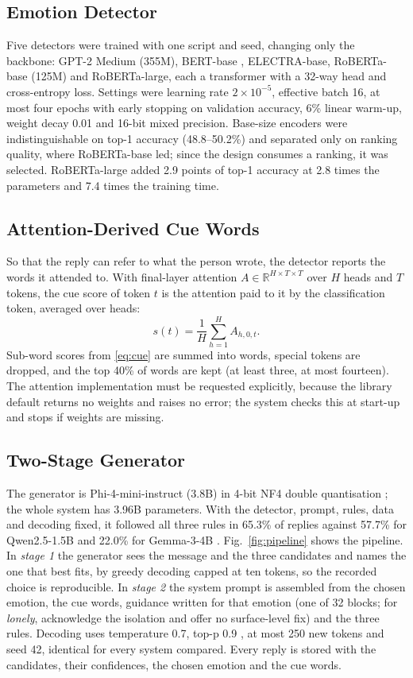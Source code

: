 \documentclass[conference]{IEEEtran}
\begin{document}
\subsection{Emotion Detector}
Five detectors were trained with one script and seed, changing only the backbone: GPT-2 Medium (355M), BERT-base \cite{b38}, ELECTRA-base, RoBERTa-base \cite{b39} (125M) and RoBERTa-large, each a transformer \cite{b40} with a 32-way head and cross-entropy loss. Settings were learning rate $2\times10^{-5}$, effective batch 16, at most four epochs with early stopping on validation accuracy, 6\% linear warm-up, weight decay 0.01 and 16-bit mixed precision. Base-size encoders were indistinguishable on top-1 accuracy (48.8--50.2\%) and separated only on ranking quality, where RoBERTa-base led; since the design consumes a ranking, it was selected. RoBERTa-large added 2.9 points of top-1 accuracy at 2.8 times the parameters and 7.4 times the training time.

\subsection{Attention-Derived Cue Words}
So that the reply can refer to what the person wrote, the detector reports the words it attended to. With final-layer attention $A\in\mathbb{R}^{H\times T\times T}$ over $H$ heads and $T$ tokens, the cue score of token $t$ is the attention paid to it by the classification token, averaged over heads:
\begin{equation}
s(t)=\frac{1}{H}\sum_{h=1}^{H}A_{h,0,t}.\label{eq:cue}
\end{equation}
Sub-word scores from \eqref{eq:cue} are summed into words, special tokens are dropped, and the top 40\% of words are kept (at least three, at most fourteen). The attention implementation must be requested explicitly, because the library default returns no weights and raises no error; the system checks this at start-up and stops if weights are missing.

\subsection{Two-Stage Generator}
The generator is Phi-4-mini-instruct \cite{b41} (3.8B) in 4-bit NF4 double quantisation \cite{b42}; the whole system has 3.96B parameters. With the detector, prompt, rules, data and decoding fixed, it followed all three rules in 65.3\% of replies against 57.7\% for Qwen2.5-1.5B \cite{b43} and 22.0\% for Gemma-3-4B \cite{b44}. Fig.~\ref{fig:pipeline} shows the pipeline. In \textit{stage 1} the generator sees the message and the three candidates and names the one that best fits, by greedy decoding capped at ten tokens, so the recorded choice is reproducible. In \textit{stage 2} the system prompt is assembled from the chosen emotion, the cue words, guidance written for that emotion (one of 32 blocks; for \textit{lonely}, acknowledge the isolation and offer no surface-level fix) and the three rules. Decoding uses temperature 0.7, top-p 0.9 \cite{b45}, at most 250 new tokens and seed 42, identical for every system compared. Every reply is stored with the candidates, their confidences, the chosen emotion and the cue words.
\end{document}
